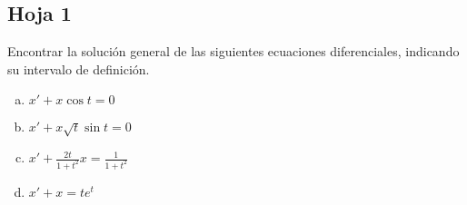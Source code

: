 \documentclass[../main.tex]{subfiles}
\begin{document}
\subsection{Hoja 1}

\begin{problem}
	Encontrar la solución general de las siguientes ecuaciones diferenciales,
	indicando su intervalo de definición.

	\begin{multicols}{2}
	\begin{enumerate}[a)]
		\item \(\displaystyle x' + x \cos t = 0\)
		\item \(\displaystyle x' + x\sqrt{t} \sin t = 0\)
		\item \(\displaystyle x' + \frac{2t}{1 + t^2}x = \frac{1}{1 + t^2}\)
		\item \(\displaystyle x' + x = t e^t\)
	\end{enumerate}
	\end{multicols}
\end{problem}
\end{document}
